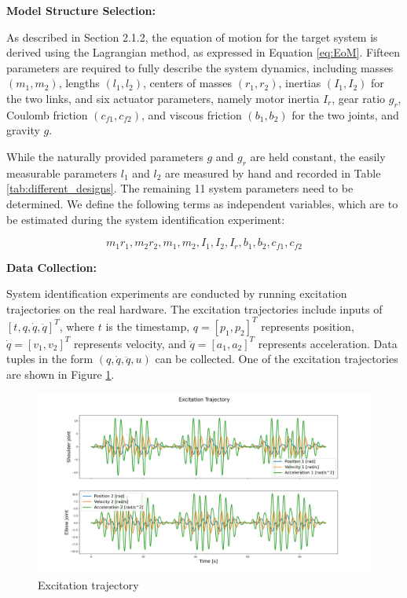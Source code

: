 \textbf{Model Structure Selection:}

As described in Section 2.1.2, the equation of motion for the target system is derived using the Lagrangian method, as expressed in Equation \ref{eq:EoM}. Fifteen parameters are required to fully describe the system dynamics, including masses $(m_1, m_2)$, lengths $(l_1, l_2)$, centers of masses $(r_1, r_2)$, inertias $(I_1, I_2)$ for the two links, and six actuator parameters, namely motor inertia $I_r$, gear ratio $g_r$, Coulomb friction $(c_{f1}, c_{f2})$, and viscous friction $(b_1, b_2)$ for the two joints, and gravity $g$.

While the naturally provided parameters $g$ and $g_r$ are held constant, the easily measurable parameters $l_1$ and $l_2$ are measured by hand and recorded in Table \ref{tab:different_designs}. The remaining 11 system parameters need to be determined. We define the following terms as independent variables, which are to be estimated during the system identification experiment:

\[m_1 r_1, m_2 r_2, m_1, m_2, I_1, I_2, I_r, b_1, b_2, c_{f1}, c_{f2}\]

\textbf{Data Collection:}

System identification experiments are conducted by running excitation trajectories on the real hardware. The excitation trajectories include inputs of $[t, q, \dot{q}, \ddot{q}]^T$, where $t$ is the timestamp, $q = [p_1, p_2]^T$ represents position, $\dot{q} = [v_1, v_2]^T$ represents velocity, and $\ddot{q} = [a_1, a_2]^T$ represents acceleration. Data tuples in the form $(q, \dot{q}, \ddot{q}, u)$ can be collected. One of the excitation trajectories are shown in Figure \ref{fig:excitation_traj}.

\begin{figure}[H]
    \centering
    \includegraphics[width=1.1\linewidth]{figures/hardware_setup/excitation_traj.png}
    \caption{Excitation trajectory}
    \label{fig:excitation_traj}
\end{figure}

